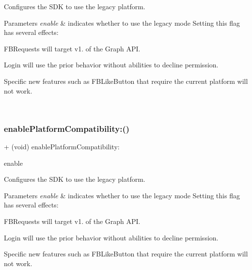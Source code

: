 Configures the S\+DK to use the legacy platform. 
\begin{DoxyParams}{Parameters}
{\em enable} & indicates whether to use the legacy mode  Setting this flag has several effects\+:
\begin{DoxyItemize}
\item F\+B\+Requests will target v1. of the Graph A\+PI.
\item Login will use the prior behavior without abilities to decline permission.
\item Specific new features such as {\ttfamily F\+B\+Like\+Button} that require the current platform will not work. 
\end{DoxyItemize}\\
\hline
\end{DoxyParams}
\mbox{\label{interfaceFBSettings_a896c1bdd4227035fba49c90d06c101a2}} 
\subsubsection{\texorpdfstring{enable\+Platform\+Compatibility\+:()}{enablePlatformCompatibility:()}\hspace{0.1cm}{\footnotesize\ttfamily [5/5]}}
{\footnotesize\ttfamily + (void) enable\+Platform\+Compatibility\+: \begin{DoxyParamCaption}\item[{(B\+O\+OL)}]{enable }\end{DoxyParamCaption}}

Configures the S\+DK to use the legacy platform. 
\begin{DoxyParams}{Parameters}
{\em enable} & indicates whether to use the legacy mode  Setting this flag has several effects\+:
\begin{DoxyItemize}
\item F\+B\+Requests will target v1. of the Graph A\+PI.
\item Login will use the prior behavior without abilities to decline permission.
\item Specific new features such as {\ttfamily F\+B\+Like\+Button} that require the current platform will not work. 
\end{DoxyItemize}\\
\hline
\end{DoxyParams}
\mbox{\label{interfaceFBSettings_a7ce923f25dd500f81ce518e998bf2f39}} 
